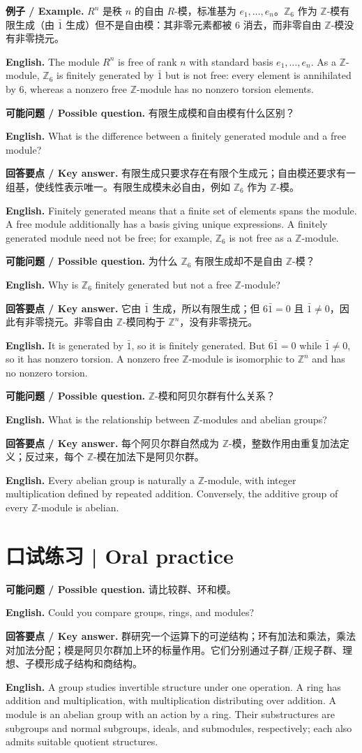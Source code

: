 \documentclass[UTF8,11pt,a4paper]{ctexart}
\newcommand{\EN}[1]{\par\noindent\textbf{English.} #1\par}
\newcommand{\EX}[2]{\par\noindent\textbf{例子 / Example.} #1\par\EN{#2}}
\newcommand{\ASK}[4]{\par\noindent\textbf{可能问题 / Possible question.} #1\par\EN{#2}\noindent\textbf{回答要点 / Key answer.} #3\par\EN{#4}\medskip}
\begin{document}
\EX{$R^n$ 是秩 $n$ 的自由 $R$-模，标准基为 $e_1,\ldots,e_n$。$\mathbb Z_6$ 作为 $\mathbb Z$-模有限生成（由 $\bar1$ 生成）但不是自由模：其非零元素都被 $6$ 消去，而非零自由 $\mathbb Z$-模没有非零挠元。}{The module $R^n$ is free of rank $n$ with standard basis $e_1,\ldots,e_n$. As a $\mathbb Z$-module, $\mathbb Z_6$ is finitely generated by $\bar1$ but is not free: every element is annihilated by $6$, whereas a nonzero free $\mathbb Z$-module has no nonzero torsion elements.}

\ASK{有限生成模和自由模有什么区别？}{What is the difference between a finitely generated module and a free module?}{有限生成只要求存在有限个生成元；自由模还要求有一组基，使线性表示唯一。有限生成模未必自由，例如 $\mathbb Z_6$ 作为 $\mathbb Z$-模。}{Finitely generated means that a finite set of elements spans the module. A free module additionally has a basis giving unique expressions. A finitely generated module need not be free; for example, $\mathbb Z_6$ is not free as a $\mathbb Z$-module.}

\ASK{为什么 $\mathbb Z_6$ 有限生成却不是自由 $\mathbb Z$-模？}{Why is $\mathbb Z_6$ finitely generated but not a free $\mathbb Z$-module?}{它由 $\bar1$ 生成，所以有限生成；但 $6\bar1=0$ 且 $\bar1\ne0$，因此有非零挠元。非零自由 $\mathbb Z$-模同构于 $\mathbb Z^n$，没有非零挠元。}{It is generated by $\bar1$, so it is finitely generated. But $6\bar1=0$ while $\bar1\ne0$, so it has nonzero torsion. A nonzero free $\mathbb Z$-module is isomorphic to $\mathbb Z^n$ and has no nonzero torsion.}

\ASK{$\mathbb Z$-模和阿贝尔群有什么关系？}{What is the relationship between $\mathbb Z$-modules and abelian groups?}{每个阿贝尔群自然成为 $\mathbb Z$-模，整数作用由重复加法定义；反过来，每个 $\mathbb Z$-模在加法下是阿贝尔群。}{Every abelian group is naturally a $\mathbb Z$-module, with integer multiplication defined by repeated addition. Conversely, the additive group of every $\mathbb Z$-module is abelian.}

\section*{口试练习 | Oral practice}
\ASK{请比较群、环和模。}{Could you compare groups, rings, and modules?}{群研究一个运算下的可逆结构；环有加法和乘法，乘法对加法分配；模是阿贝尔群加上环的标量作用。它们分别通过子群/正规子群、理想、子模形成子结构和商结构。}{A group studies invertible structure under one operation. A ring has addition and multiplication, with multiplication distributing over addition. A module is an abelian group with an action by a ring. Their substructures are subgroups and normal subgroups, ideals, and submodules, respectively; each also admits suitable quotient structures.}
\end{document}
